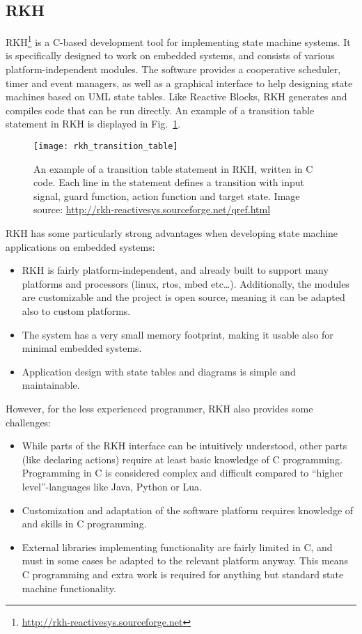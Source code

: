 \subsection{RKH}
\label{sec:rkh_state_machine}
RKH\footnote{\url{http://rkh-reactivesys.sourceforge.net}} is a C-based development tool for implementing state machine systems. It is specifically designed to work on embedded systems, and consists of various platform-independent modules. The software provides a cooperative scheduler, timer and event managers, as well as a graphical interface to help designing state machines based on UML state tables. Like Reactive Blocks, RKH generates and compiles code that can be run directly. An example of a transition table statement in RKH is displayed in Fig.~\ref{figure:rkh_transition}.

\begin{figure}[htp]
	\centering
	\texttt{[image: rkh\_transition\_table]}
	\caption[A transition table statement in RKH]{An example of a transition table statement in RKH, written in C code. Each line in the statement defines a transition with input signal, guard function, action function and target state. Image source: \url{http://rkh-reactivesys.sourceforge.net/qref.html}}
	\label{figure:rkh_transition}
\end{figure}

\noindent
RKH has some particularly strong advantages when developing state machine applications on embedded systems:

\begin{itemize}
\item RKH is fairly platform-independent, and already built to support many platforms and processors (linux, \gls{rtos}, mbed etc…). Additionally, the modules are customizable and the project is open source, meaning it can be adapted also to custom platforms.
\item The system has a very small memory footprint, making it usable also for minimal embedded systems.
\item Application design with state tables and diagrams is simple and maintainable.
\end{itemize}

\noindent
However, for the less experienced programmer, RKH also provides some challenges:

\begin{itemize}
	\item While parts of the RKH interface can be intuitively understood, other parts (like declaring actions) require at least basic knowledge of C programming. Programming in C is considered complex and difficult compared to ``higher level''-languages like Java, Python or Lua.
	\item Customization and adaptation of the software platform requires knowledge of and skills in C programming.
	\item External libraries implementing functionality are fairly limited in C, and must in some cases be adapted to the relevant platform anyway. This means C programming and extra work is required for anything but standard state machine functionality.
\end{itemize}

